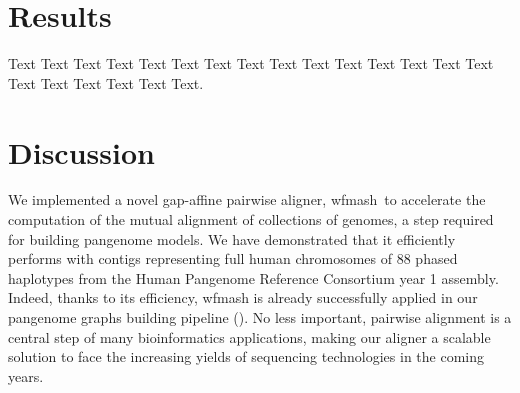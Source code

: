 \documentclass{bioinfo}
\newcommand{\wfmash}{wfmash}
\begin{document}
    \section{Results}

    Text Text Text Text Text Text Text Text Text Text Text Text Text
    Text Text Text Text Text Text Text Text.


    \section{Discussion}

    We implemented a novel gap-affine pairwise aligner, \wfmash\, to accelerate the computation of the mutual
    alignment of collections of genomes, a step required for building pangenome models. We have demonstrated that
    it efficiently performs with contigs representing full human chromosomes of 88 phased haplotypes from the
    Human Pangenome Reference Consortium year 1 assembly. Indeed, thanks to its efficiency, wfmash is already
    successfully applied in our pangenome graphs building pipeline (\citep{pggb}). No less important, pairwise
    alignment is a central step of many bioinformatics applications, making our aligner a scalable solution to face the
    increasing yields of sequencing technologies in the coming years.

%
%

%
%
%
%
%
%
%
%
%
\end{document}
